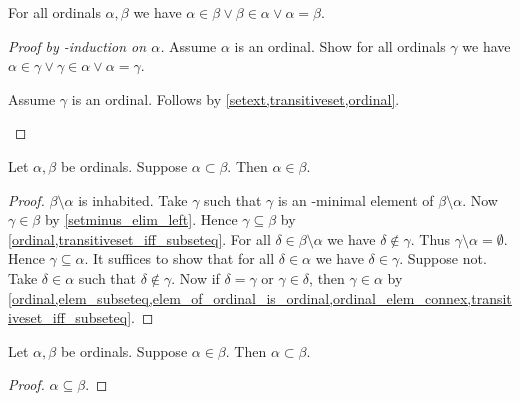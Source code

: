\begin{proposition}\label{ordinal_elem_connex}
    For all ordinals $\alpha,\beta$
    we have $\alpha\in\beta\lor \beta\in\alpha \lor \alpha = \beta$.
\end{proposition}
\begin{proof}[Proof by \in-induction on $\alpha$]
    Assume $\alpha$ is an ordinal.
    Show for all ordinals $\gamma$ we have $\alpha\in\gamma\lor \gamma\in\alpha \lor \alpha = \gamma$.
    \begin{subproof}
        Assume $\gamma$ is an ordinal.
        Follows by \cref{setext,transitiveset,ordinal}.
    \end{subproof}
\end{proof}

\begin{proposition}\label{ordinal_proper_subset_implies_elem}
    Let $\alpha,\beta$ be ordinals.
    Suppose $\alpha\subset\beta$.
    Then $\alpha\in\beta$.
\end{proposition}
\begin{proof}
    $\beta\setminus\alpha$ is inhabited.
    Take $\gamma$ such that $\gamma$ is an \in-minimal element of $\beta\setminus\alpha$.
    Now $\gamma\in\beta$ by \cref{setminus_elim_left}.
    Hence $\gamma\subseteq\beta$
        by \cref{ordinal,transitiveset_iff_subseteq}.
    For all $\delta\in\beta\setminus\alpha$ we have $\delta\notin\gamma$.
    Thus $\gamma\setminus\alpha = \emptyset$.
    Hence $\gamma\subseteq\alpha$.
    It suffices to show that for all $\delta\in\alpha$ we have $\delta\in\gamma$.
        Suppose not.
        Take $\delta\in\alpha$ such that $\delta\notin\gamma$.
        Now if $\delta = \gamma$ or $\gamma\in\delta$, then $\gamma\in\alpha$
            by \cref{ordinal,elem_subseteq,elem_of_ordinal_is_ordinal,ordinal_elem_connex,transitiveset_iff_subseteq}.
\end{proof}

\begin{proposition}\label{ordinal_elem_implies_proper_subset}
    Let $\alpha,\beta$ be ordinals.
    Suppose $\alpha\in\beta$.
    Then $\alpha\subset\beta$.
\end{proposition}
\begin{proof}
    $\alpha\subseteq\beta$.
\end{proof}


